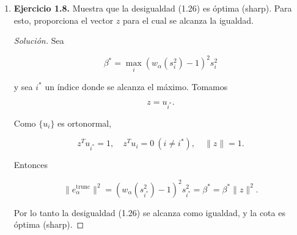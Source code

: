 \documentclass[12pt,spanish,mexico]{article}
\numberwithin{equation}{section}
\theoremstyle{definition}
\theoremstyle{remark}
\newenvironment{solution}{\begin{proof}[Solución]}{\end{proof}}
\begin{document}
\begin{enumerate}[label=(\alph*)]
\begin{enumerate}
\begin{solution}
Como $\{u_i\}$ es una base ortonormal,

\[
\sum_{i=1}^{n}
|z^{T}u_i|^2
=
\|z\|^2.
\]

Por consiguiente,

\[
\|e_\alpha^{\text{trunc}}\|^2
\le
\max_{1\le i\le n}
(w_\alpha(s_i^2)-1)^2 s_i^2
\|z\|^2.
\]

Ahora verificamos que para filtros regulares TSVD se cumple

\[
(w_\alpha(s^2)-1)^2 s^2 \le \alpha
\quad \text{para todo } s.
\]


Si $s^2>\alpha$, entonces $w_\alpha(s^2)=1$ y

\[
(1-1)^2 s^2 = 0 \le \alpha.
\]

Si $s^2\le\alpha$, entonces $w_\alpha(s^2)=0$ y

\[
(0-1)^2 s^2 = s^2 \le \alpha.
\]

Por lo tanto, la desigualdad se cumple para todo $s$ en el caso TSVD.

Concluimos que

\[
(w_\alpha(s^2)-1)^2 s^2 \le \alpha
\quad \text{para todo } s
\]

tanto para TSVD.
Por lo tanto

\[
\|e_\alpha^{\text{trunc}}\|^2
\le
\alpha \|z\|^2.
\]

Esto confirma (1.26).

        \end{solution}
        \item \textbf{Ejercicio 1.8.} Muestra que la desigualdad (1.26) es óptima (sharp). Para esto, proporciona el vector \(z\) para el cual se alcanza la igualdad.
\begin{solution}

Sea

\[
\beta^*
=
\max_i
(w_\alpha(s_i^2)-1)^2 s_i^2
\]

y sea $i^*$ un índice donde se alcanza el máximo. Tomamos

\[
z = u_{i^*}.
\]

Como $\{u_i\}$ es ortonormal,

\[
z^T u_{i^*}=1,
\quad
z^T u_i=0 \ (i\neq i^*),
\quad
\|z\|=1.
\]

Entonces

\[
\|e_\alpha^{\text{trunc}}\|^2
=
(w_\alpha(s_{i^*}^2)-1)^2 s_{i^*}^2
=
\beta^*
=
\beta^{*}\|z\|^2.
\]

Por lo tanto la desigualdad (1.26) se alcanza como igualdad,
y la cota es óptima (sharp).   
\end{solution}


\end{enumerate}
\end{enumerate}
\end{document}
